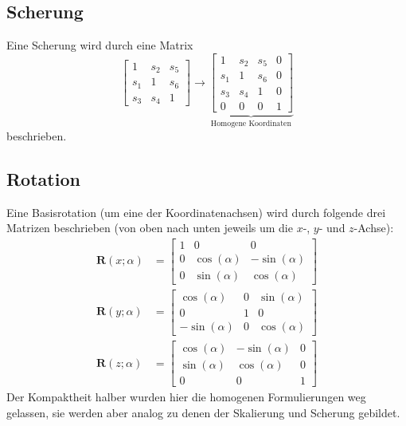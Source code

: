 \documentclass[a4paper, 11pt, accentcolor = tud3b]{tudreport}
\newcommand{\mat}[1]{\boldsymbol{#1}}
\begin{document}
			\subsection{Scherung}
				Eine Scherung wird durch eine Matrix
				\begin{equation*}
					\begin{bmatrix}
						1   & s_2 & s_5 \\
						s_1 & 1   & s_6 \\
						s_3 & s_4 & 1
					\end{bmatrix}
					\to
					\underbrace{
						\begin{bmatrix}
							1   & s_2 & s_5 & 0 \\
							s_1 & 1   & s_6 & 0 \\
							s_3 & s_4 & 1   & 0 \\
							0   & 0   & 0   & 1
						\end{bmatrix}
					}_\text{Homogene Koordinaten}
				\end{equation*}
				beschrieben.

			\subsection{Rotation}
				Eine Basisrotation (um eine der Koordinatenachsen) wird durch folgende drei Matrizen beschrieben (von oben nach unten jeweils um die \(x\)-, \(y\)- und \(z\)-Achse):
				\begin{align*}
					\mat{R}(x; \alpha) &=
						\begin{bmatrix}
							1 & 0            & 0             \\
							0 & \cos(\alpha) & -\sin(\alpha) \\
							0 & \sin(\alpha) & \cos(\alpha)
						\end{bmatrix} \\
					\mat{R}(y; \alpha) &=
						\begin{bmatrix}
							\cos(\alpha)  & 0 & \sin(\alpha) \\
							0             & 1 & 0            \\
							-\sin(\alpha) & 0 & \cos(\alpha)
						\end{bmatrix} \\
					\mat{R}(z; \alpha) &=
						\begin{bmatrix}
							\cos(\alpha) & -\sin(\alpha) & 0 \\
							\sin(\alpha) & \cos(\alpha)  & 0 \\
							0            & 0             & 1
						\end{bmatrix}
				\end{align*}
				Der Kompaktheit halber wurden hier die homogenen Formulierungen weg gelassen, sie werden aber analog zu denen der Skalierung und Scherung gebildet.
\end{document}
